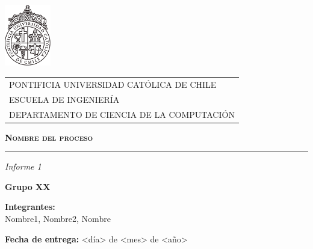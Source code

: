 \begin{titlepage}
\includegraphics[width=2cm]{img/logo-uc-4.pdf} %
\vspace*{-2.2cm} %


\begin{tabular}{l}
\hspace{2cm} PONTIFICIA UNIVERSIDAD CATÓLICA DE CHILE\\
\hspace{2cm} ESCUELA DE INGENIERÍA\\
\hspace{2cm} DEPARTAMENTO DE CIENCIA DE LA COMPUTACIÓN\\
\end{tabular}

\begin{center}
\vspace{3cm}
{\scshape\Huge \textbf{Nombre del proceso} \par}
\rule{80mm}{0.1mm}

{\itshape\LARGE Informe 1 \par}
\vfill
{\Large \textbf{Grupo XX} \par}
\vspace{0.5cm}
{\large \textbf{Integrantes:}\\\normalsize Nombre1, Nombre2, Nombre \par} 


\medskip
\textbf{Fecha de entrega:} <día> de <mes> de <año>
\vspace{3cm}
\end{center}
\end{titlepage}
\newpage